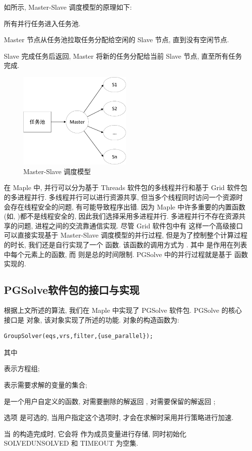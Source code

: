 如所示, Master-Slave 调度模型的原理如下:
\begin{compactenum}[Step 1.]
\item 所有并行任务进入任务池.
\item Master 节点从任务池拉取任务分配给空闲的 Slave 节点, 直到没有空闲节点.
\item Slave 完成任务后返回, Master 将新的任务分配给当前 Slave 节点, 直至所有任务完成. 
\end{compactenum}

\begin{figure}[htbp]
\centering 
\includegraphics[width=0.5\textwidth]{fig/msp.pdf}
\caption{Master-Slave 调度模型}\label{msp}
\end{figure}

在 Maple 中, 并行可以分为基于 Threads 软件包的多线程并行和基于 Grid 软件包的多进程并行. 多线程并行可以进行资源共享, 但当多个线程同时访问一个资源时会存在线程安全的问题, 有可能导致程序出错. 因为 Maple 中许多重要的内置函数(如, )都不是线程安全的, 因此我们选择采用多进程并行. 多进程并行不存在资源共享的问题, 进程之间的交流靠通信实现. 尽管 Grid 软件包中有  这样一个高级接口可以直接实现基于 Master-Slave 调度模型的并行过程, 但是为了控制整个计算过程的时长, 我们还是自行实现了一个  函数. 该函数的调用方式为 . 其中  是作用在列表  中每个元素上的函数, 而  则是总的时间限制. PGSolve 中的并行过程就是基于  函数实现的. 

\subsection{PGSolve软件包的接口与实现}
根据上文所述的算法, 我们在 Maple 中实现了 PGSolve 软件包. PGSolve 的核心接口是  对象, 该对象实现了所述的功能. 对象的构造函数为: 
\begin{verbatim}
GroupSolver(eqs,vrs,filter,{use_parallel});
\end{verbatim}
其中 
\begin{compactitem}[\textbullet]
\item {} 表示方程组;
\item {} 表示需要求解的变量的集合;
\item {} 是一个用户自定义的函数, 对需要删除的解返回 , 对需要保留的解返回 ;
\item 选项  是可选的, 当用户指定这个选项时,  才会在求解时采用并行策略进行加速.
\end{compactitem}
当  的构造完成时, 它会将  作为成员变量进行存储, 同时初始化 SOLVED\D UNSOLVED 和 TIMEOUT 为空集. 

